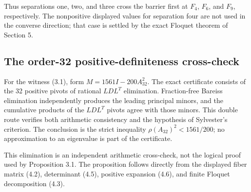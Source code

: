 Thus separations one, two, and three cross the barrier first at \(F_4\), \(F_6\),
and \(F_9\), respectively. The nonpositive displayed values for separation four
are not used in the converse direction; that case is settled by the exact
Floquet theorem of Section 5.

\subsection{The order-32 positive-definiteness cross-check}

For the witness (3.1), form \(M=1561I-200A_32^2\). The exact certificate consists
of the 32 positive pivots of rational \(LDL^T\) elimination. Fraction-free
Bareiss elimination independently produces the leading principal minors, and
the cumulative products of the \(LDL^T\) pivots agree with those minors. This
double route verifies both arithmetic consistency and the hypothesis of
Sylvester's criterion. The conclusion is the strict inequality
\(\rho(A_32)^2<1561/200\); no approximation to an eigenvalue is part of the
certificate.

This elimination is an independent arithmetic cross-check, not the logical
proof used by Proposition 3.1. The proposition follows directly from the
displayed fiber matrix (4.2), determinant (4.5), positive expansion (4.6),
and finite Floquet decomposition (4.3).
